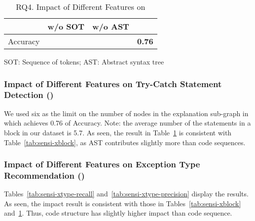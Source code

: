 \begin{table}[t]
  \caption{RQ4. Impact of Different Features on {\xstate}}
  \vspace{-12pt}
  \small
	\begin{center}
		\renewcommand{\arraystretch}{1}
		\begin{tabular}{p{1.75cm}<{\centering}|p{1.75cm}<{\centering}|p{1.75cm}<{\centering}|p{1.75cm}<{\centering}}
			\hline
			  & \tool w/o SOT & \tool w/o AST & \tool \\
			\hline
			Accuracy    & & & \textbf{0.76} \\
			\hline
		\end{tabular}
		SOT: Sequence of tokens; AST: Abstract syntax tree
		\label{tab:sensi-xstate}
	\end{center}
\end{table}

\subsubsection{Impact of Different Features on Try-Catch Statement Detection ({\xstate})}

We used six as the limit on the number of nodes in the explanation
sub-graph in which {\tool} achieves 0.76 of Accuracy. Note: the
average number of the statements in a  block in our
dataset is 5.7. As seen, the result in Table~\ref{tab:sensi-xstate} is
consistent with Table~\ref{tab:sensi-xblock}, as AST contributes
slightly more than code sequences.


\subsubsection{Impact of Different Features on Exception Type Recommendation ({\xtype})}

Tables~\ref{tab:sensi-xtype-recall}
and~\ref{tab:sensi-xtype-precision} display the results. As seen, the
impact result is consistent with those in
Tables~\ref{tab:sensi-xblock} and~\ref{tab:sensi-xstate}.
Thus, code structure has slightly higher impact than code sequence.

